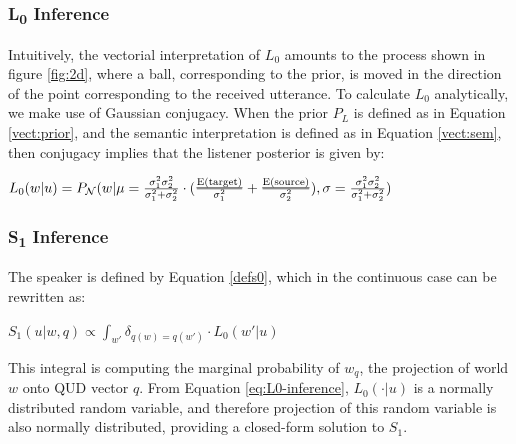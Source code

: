\documentclass[OpenMind]{stjour}
\begin{document}
\subsubsection{L\textsubscript{0} Inference}


	Intuitively, the vectorial interpretation of $L_0$ amounts to the process shown in figure \ref{fig:2d}, where a ball, corresponding to the prior, is moved in the direction of the point corresponding to the received utterance. To calculate $L_0$ analytically, we make use of Gaussian conjugacy. When the prior $P_L$ is defined as in Equation \ref{vect:prior}, and the semantic interpretation is defined as in Equation \ref{vect:sem}, then conjugacy implies that the listener posterior is given by:

	 \begin{exe}
	\ex $L_0(w|u) = P_{\mathcal{N}}(w\vert\mu=\frac{\sigma_1^2 \sigma_2^2}{\sigma_1^2+\sigma_2^2}\cdot(\frac{{\textrm{\emph{E(target)}}}}{\sigma_1^2}+\frac{{\textrm{\emph{E(source)}}}}{\sigma_2^2}), \sigma=\frac{\sigma_1^2 \sigma_2^2}{\sigma_1^2+\sigma_2^2})$  \label{eq:L0-inference}
	 \end{exe}
















\subsubsection{S\textsubscript{1} Inference}
		The speaker is defined by Equation \ref{defs0}, which in the continuous case can be rewritten as:
		\begin{exe}
		\ex $S_1(u\vert w,q) \propto \int_{w'} \delta_{q(w)=q(w')} \cdot L_0(w'\vert u)$
		\end{exe}
		This integral is computing the marginal probability of $w_q$, the projection of world $w$ onto QUD vector $q$. From Equation \ref{eq:L0-inference}, $L_0(\cdot \vert u)$ is a normally distributed random variable, and therefore projection of this random variable is also normally distributed, providing a closed-form solution to $S_1$.
\end{document}
